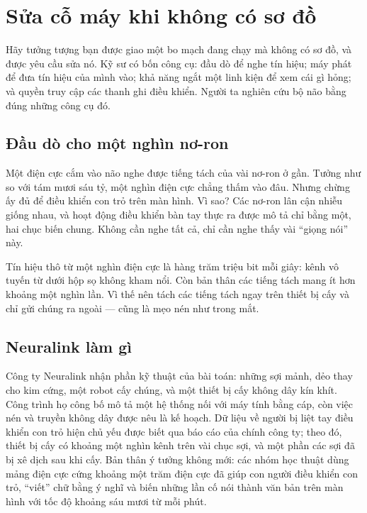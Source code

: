 \chapter{Sửa cỗ máy khi không có sơ đồ}


Hãy tưởng tượng bạn được giao một bo mạch đang chạy mà không có sơ đồ, và được yêu cầu sửa nó. Kỹ sư có bốn công cụ: đầu dò để nghe tín hiệu; máy phát để đưa tín hiệu của mình vào; khả năng ngắt một linh kiện để xem cái gì hỏng; và quyền truy cập các thanh ghi điều khiển. Người ta nghiên cứu bộ não bằng đúng những công cụ đó.

\section*{Đầu dò cho một nghìn nơ-ron}

Một điện cực cắm vào não nghe được tiếng tách của vài nơ-ron ở gần. Tưởng như so với tám mươi sáu tỷ, một nghìn điện cực chẳng thấm vào đâu. Nhưng chừng ấy đủ để điều khiển con trỏ trên màn hình. Vì sao? Các nơ-ron lân cận nhiễu giống nhau, và hoạt động điều khiển bàn tay thực ra được mô tả chỉ bằng một, hai chục biến chung. Không cần nghe tất cả, chỉ cần nghe thấy vài ``giọng nói'' này.

Tín hiệu thô từ một nghìn điện cực là hàng trăm triệu bit mỗi giây: kênh vô tuyến từ dưới hộp sọ không kham nổi. Còn bản thân các tiếng tách mang ít hơn khoảng một nghìn lần. Vì thế nên tách các tiếng tách ngay trên thiết bị cấy và chỉ gửi chúng ra ngoài --- cũng là mẹo nén như trong mắt.

\section*{Neuralink làm gì}

Công ty Neuralink nhận phần kỹ thuật của bài toán: những sợi mảnh, dẻo thay cho kim cứng, một robot cấy chúng, và một thiết bị cấy không dây kín khít. Công trình họ công bố mô tả một hệ thống nối với máy tính bằng cáp, còn việc nén và truyền không dây được nêu là kế hoạch. Dữ liệu về người bị liệt tay điều khiển con trỏ hiện chủ yếu được biết qua báo cáo của chính công ty; theo đó, thiết bị cấy có khoảng một nghìn kênh trên vài chục sợi, và một phần các sợi đã bị xê dịch sau khi cấy. Bản thân ý tưởng không mới: các nhóm học thuật dùng mảng điện cực cứng khoảng một trăm điện cực đã giúp con người điều khiển con trỏ, ``viết'' chữ bằng ý nghĩ và biến những lần cố nói thành văn bản trên màn hình với tốc độ khoảng sáu mươi từ mỗi phút.

